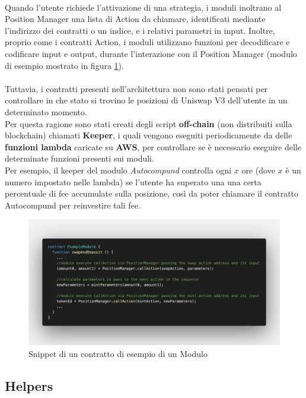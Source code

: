 \documentclass[12pt,a4paper]{report}
\begin{document}
\noindent\\Quando l'utente richiede l'attivazione di una strategia, i moduli inoltrano al Position Manager una lista di Action da chiamare, identificati mediante l'indirizzo dei contratti o un indice, e i relativi parametri in input. Inoltre, proprio come i contratti Action, i moduli utilizzano funzioni per decodificare e codificare input e output, durante l'interazione con il Position Manager (modulo di esempio mostrato in figura \ref{fig:example_module}).
\\\\Tuttavia, i contratti presenti nell'architettura non sono stati pensati per controllare in che stato si trovino le posizioni di Uniswap V3 dell'utente in un determinato momento.\\ Per questa ragione sono stati creati degli script \textbf{off-chain} (non distribuiti sulla blockchain) chiamati \textbf{Keeper}, i quali vengono eseguiti periodicamente da delle \textbf{funzioni lambda}\cite{lambda} caricate su \textbf{AWS}\cite{aws}, per controllare se è necessario eseguire delle determinate funzioni presenti sui moduli.\\Per esempio, il keeper del modulo \textit{Autocompund} controlla ogni $x$ ore (dove $x$ è un numero impostato nelle lambda) se l'utente ha superato una una certa percentuale di fee accumulate sulla posizione, così da poter chiamare il contratto Autocompund per reinvestire tali fee.

\begin{figure}[H]
  \includegraphics[scale=0.26]{example_module.png}
  \centering
  \caption{Snippet di un contratto di esempio di un Modulo}
  \label{fig:example_module}
\end{figure}

\subsection{Helpers}
\end{document}
